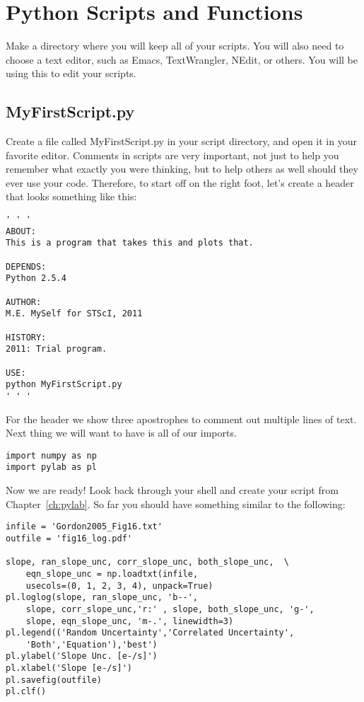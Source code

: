 \chapter{Python Scripts and Functions}
\label{ch:scripts}

Make a directory where you will keep all of your scripts.  You will
also need to choose a text editor, such as Emacs, TextWrangler, NEdit,
or others.  You will be using this to edit your scripts.
 
\section{MyFirstScript.py}

Create a file called MyFirstScript.py in your script directory, and
open it in your favorite editor.  Comments in scripts are very
important, not just to help you remember what exactly you were
thinking, but to help others as well should they ever use your code.
Therefore, to start off on the right foot, let's create a header that
looks something like this:

\begin{verbatim}
' ' '
ABOUT:
This is a program that takes this and plots that.

DEPENDS:
Python 2.5.4

AUTHOR:
M.E. MySelf for STScI, 2011

HISTORY:
2011: Trial program.

USE:
python MyFirstScript.py
' ' '
\end{verbatim}

For the header we show three apostrophes to comment out multiple lines
of text.  Next thing we will want to have is all of our imports.

\begin{verbatim}
import numpy as np
import pylab as pl 
\end{verbatim}

Now we are ready!  Look back through your shell and create your script
from Chapter~\ref{ch:pylab}.  So far you should have something similar
to the following:

\begin{verbatim}
infile = 'Gordon2005_Fig16.txt'
outfile = 'fig16_log.pdf' 

slope, ran_slope_unc, corr_slope_unc, both_slope_unc,  \
    eqn_slope_unc = np.loadtxt(infile, 
    usecols=(0, 1, 2, 3, 4), unpack=True) 
pl.loglog(slope, ran_slope_unc, 'b--',  
    slope, corr_slope_unc,'r:' , slope, both_slope_unc, 'g-',  
    slope, eqn_slope_unc, 'm-.', linewidth=3) 
pl.legend(('Random Uncertainty','Correlated Uncertainty',  
    'Both','Equation'),'best')
pl.ylabel('Slope Unc. [e-/s]') 
pl.xlabel('Slope [e-/s]') 
pl.savefig(outfile) 
pl.clf()
\end{verbatim}

